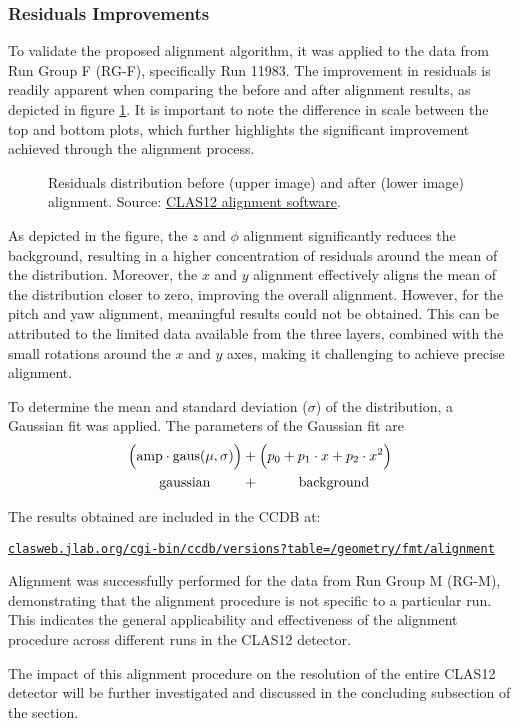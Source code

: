 \subsubsection{Residuals Improvements}
\label{12.22::residuals_improvements}
    To validate the proposed alignment algorithm, it was applied to the data from Run Group F (RG-F), specifically Run 11983.
    The improvement in residuals is readily apparent when comparing the before and after alignment results, as depicted in figure \ref{fig::12.22::fmt_residuals_comparison}.
    It is important to note the difference in scale between the top and bottom plots, which further highlights the significant improvement achieved through the alignment process.

    \begin{figure}[t!]
        \centering{}
        \caption[Residuals distribution improvement.]{Residuals distribution before (upper image) and after (lower image) alignment.
        Source: \hyperlink{github.com/JeffersonLab/clas12alignment}{CLAS12 alignment software}.}
        \label{fig::12.22::fmt_residuals_comparison}
    \end{figure}

    As depicted in the figure, the $z$ and $\phi$ alignment significantly reduces the background, resulting in a higher concentration of residuals around the mean of the distribution.
    Moreover, the $x$ and $y$ alignment effectively aligns the mean of the distribution closer to zero, improving the overall alignment.
    However, for the pitch and yaw alignment, meaningful results could not be obtained.
    This can be attributed to the limited data available from the three layers, combined with the small rotations around the $x$ and $y$ axes, making it challenging to achieve precise alignment.

    To determine the mean and standard deviation ($\sigma$) of the distribution, a Gaussian fit was applied. The parameters of the Gaussian fit are
     \begin{align*}
        \Big( \text{amp} \cdot \text{gaus}(\mu, \sigma) \Big) &+ \Big( p_0 + p_1\cdot x + p_2\cdot x^2 \Big) \\
        \text{gaussian} \hspace{0.8cm} &+ \hspace{1cm} \text{background}
    \end{align*}

    The results obtained are included in the CCDB at:

    \small\href{clasweb.jlab.org/cgi-bin/ccdb/versions?table=/geometry/fmt/alignment}{\texttt{clasweb.jlab.org/cgi-bin/ccdb/versions?table=/geometry/fmt/alignment}}

    Alignment was successfully performed for the data from Run Group M (RG-M), demonstrating that the alignment procedure is not specific to a particular run.
    This indicates the general applicability and effectiveness of the alignment procedure across different runs in the CLAS12 detector.

    The impact of this alignment procedure on the resolution of the entire CLAS12 detector will be further investigated and discussed in the concluding subsection of the section.
